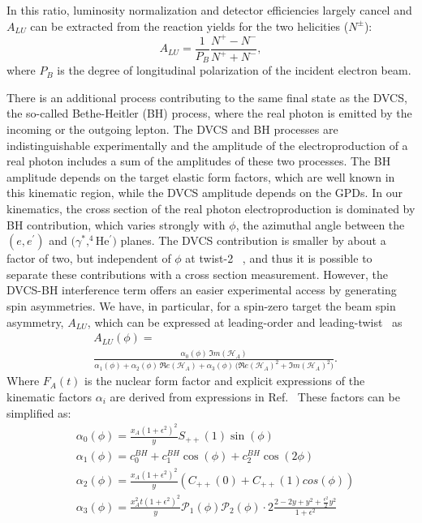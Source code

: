 \documentclass[twocolumn,nofootinbib,showpacs,prl,superscriptaddress,secnumarabic,amssymb,nobibnotes,aps,floatfix]{revtex4}
\begin{document}
In this ratio, luminosity normalization and
detector efficiencies largely cancel and $A_{LU}$ can be 
extracted from the reaction yields for the two helicities ($N^{\pm}$):
\begin{equation}
A_{LU} = \frac{1}{P_{B}} \frac{N^{+} - N^{-}}{N^{+} + N^{-} },
\end{equation}
where $P_{B}$ is the degree of longitudinal polarization of the incident electron beam.

There is an additional process contributing to the same final state as the 
DVCS, the so-called Bethe-Heitler (BH) process, where the real photon is 
emitted by the incoming or the outgoing lepton. The DVCS and BH processes are 
indistinguishable experimentally and the amplitude of the electroproduction of 
a real photon includes a sum of the amplitudes of these two processes. The BH 
amplitude depends on the target elastic form factors, which are well known in 
this kinematic region, while the DVCS amplitude depends on the GPDs. In our 
kinematics, the cross section of the real photon electroproduction is dominated 
by BH contribution, which varies strongly with $\phi$, the azimuthal angle 
between the $(e,e^\prime)$ and $(\gamma^*,^4$He$^\prime)$ planes. The DVCS 
contribution is smaller by about a factor of two, but independent of $\phi$ at twist-2~%
\cite{Belitsky:2001ns}, and thus it is possible to separate these contributions 
with a cross section measurement. However, the DVCS-BH interference term offers 
an easier experimental access by generating spin asymmetries. We have, in 
particular, for a spin-zero target the beam spin asymmetry, $A_{LU}$, which 
can be expressed at leading-order and leading-twist~\cite{Kirchner:2003wt,
Belitsky:2008bz} as
\begin{equation}
\begin{split}
&A_{LU}(\phi) = \\
&\frac{\alpha_{0}(\phi) \, \Im m(\mathcal{H}_{A})}
{\alpha_{1}(\phi) + \alpha_{2}(\phi) \, \Re e(\mathcal{H}_{A}) + \alpha_{3}(\phi) \, 
\big( \Re e(\mathcal{H}_{A})^{2} + \Im m(\mathcal{H}_{A})^{2} \big)}.
\end{split}
\label{eq:A_LU-coh}
\end{equation}
Where $F_A(t)$ is the nuclear form factor and explicit expressions of the 
kinematic factors $\alpha_i$ are derived from expressions in Ref.~\cite{Belitsky:2008bz}
These factors can be simplified as:
\begin{equation}
\begin{split}
&\alpha_0 (\phi)  = \frac{x_{A}(1+\epsilon^2)^2}{y} S_{++}(1) \sin(\phi) \\
&\alpha_1 (\phi)  =  c_0^{BH}+c_1^{BH} \cos({\phi})+c_2^{BH} \cos(2\phi) \\
&\alpha_2 (\phi)  =  \frac{x_{A}(1+\epsilon^2)^2}{y}  \left( C_{++}(0) +  
C_{++}(1) cos(\phi) \right) \\
&\alpha_3 (\phi) = \frac{x^{2}_{A}t(1+\epsilon^2)^2}{y} {\mathcal P}_1(\phi) 
{\mathcal P}_2(\phi) \cdot 2 \frac{2-2y+y^2 + \frac{\epsilon^2}{2}y^2}{1 + 
\epsilon^2}
\end{split}
\end{equation}
\end{document}
